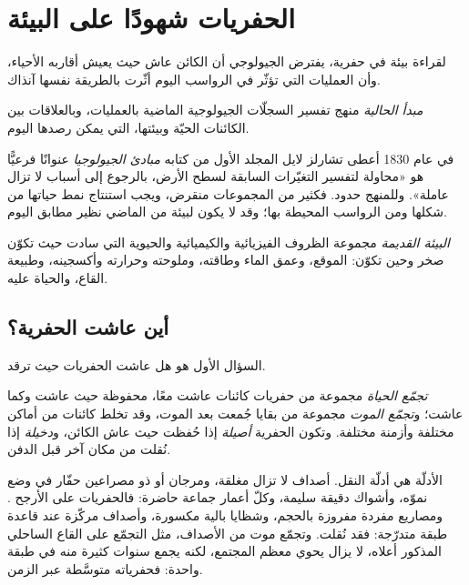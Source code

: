 \section{الحفريات شهودًا على البيئة}\label{sec:b2:palaeoenvironments:environment}

لقراءة بيئة في حفرية، يفترض الجيولوجي أن الكائن عاش حيث يعيش أقاربه
الأحياء، وأن العمليات التي تؤثّر في الرواسب اليوم أثّرت بالطريقة نفسها آنذاك.

\begin{definition}\label{def:b2:palaeoenvironments:actualism}
\emph{مبدأ الحالية} منهج تفسير السجلّات الجيولوجية الماضية بالعمليات،
وبالعلاقات بين الكائنات الحيّة وبيئتها، التي يمكن رصدها اليوم.
\end{definition}

في عام 1830 أعطى تشارلز لايل المجلد الأول من كتابه \emph{مبادئ الجيولوجيا} عنوانًا فرعيًّا هو «محاولة
لتفسير التغيّرات السابقة لسطح الأرض، بالرجوع إلى أسباب لا تزال
عاملة». وللمنهج حدود. فكثير من المجموعات منقرض، ويجب استنتاج نمط حياتها
من شكلها ومن الرواسب المحيطة بها؛ وقد لا يكون لبيئة من الماضي
نظير مطابق اليوم.

\begin{definition}\label{def:b2:palaeoenvironments:palaeoenvironment}
\emph{البيئة القديمة} مجموعة الظروف الفيزيائية والكيميائية
والحيوية التي سادت حيث تكوّن صخر وحين تكوّن: الموقع، وعمق
الماء وطاقته، وملوحته وحرارته وأكسجينه، وطبيعة القاع، والحياة
عليه.
\end{definition}

\subsection*{أين عاشت الحفرية؟}

السؤال الأول هو هل عاشت الحفريات حيث ترقد.

\begin{definition}\label{def:b2:palaeoenvironments:assemblages}
\emph{تجمّع الحياة} مجموعة من حفريات كائنات عاشت
معًا، محفوظة حيث عاشت وكما عاشت؛ و\emph{تجمّع الموت}
مجموعة من بقايا جُمعت بعد الموت، وقد تخلط كائنات من أماكن مختلفة
وأزمنة مختلفة. وتكون الحفرية \emph{أصيلة} إذا
حُفظت حيث عاش الكائن، و\emph{دخيلة} إذا
نُقلت من مكان آخر قبل الدفن.
\end{definition}

الأدلّة هي أدلّة النقل. أصداف لا تزال مغلقة، ومرجان أو ذو مصراعين حفّار في
وضع نموّه، وأشواك دقيقة سليمة، وكلّ أعمار جماعة حاضرة: فالحفريات على
الأرجح . ومصاريع مفردة مفروزة بالحجم، وشظايا بالية مكسورة، وأصداف
مركّزة عند قاعدة طبقة متدرّجة: فقد نُقلت. وتجمّع موت من الأصداف، مثل
التجمّع على القاع الساحلي المذكور أعلاه، لا يزال يحوي معظم المجتمع، لكنه يجمع سنوات كثيرة
منه في طبقة واحدة: فحفرياته متوسَّطة عبر الزمن.

